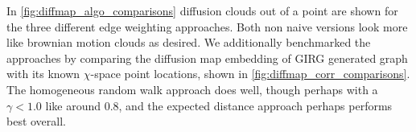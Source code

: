 




In \cref{fig:diffmap_algo_comparisons} diffusion clouds out of a point are shown for the three different edge weighting approaches. Both non naive versions look more like brownian motion clouds as desired. We additionally benchmarked the approaches by comparing the diffusion map embedding of GIRG generated graph with its known $\chi$-space point locations, shown in \cref{fig:diffmap_corr_comparisons}. The homogeneous random walk approach does well, though perhaps with a $\gamma < 1.0$ like around $0.8$, and the expected distance approach perhaps performs best overall.


